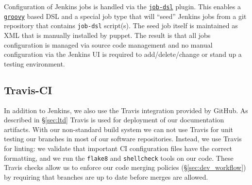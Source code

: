 Configuration of Jenkins jobs is handled via the \href{https://plugins.jenkins.io/job-dsl}{\texttt{job-dsl}} plugin.
This enables a \href{http://www.groovy-lang.org/}{\texttt{groovy}} based DSL and a special job type that
will ``seed'' Jenkins jobs from a git repository that contains \texttt{job-dsl}
script(s).  The seed job itself is maintained as XML that is manually
installed by puppet.  The result is that all jobs configuration is managed via
source code management and no manual configuration via the Jenkins UI is required to
add/delete/change or stand up a testing environment.





\subsection{Travis-CI}
\label{sec:travis-ci}

In addition to Jenkins, we also use the Travis integration provided by GitHub.
As described in \S\ref{sec:ltd} Travis is used for deployment of our documentation artifacts.
With our non-standard build system we can not use Travis for unit testing our branches in most of our software repositories.
Instead, we use Travis for linting: we validate that important CI configuration files have the correct formatting, and we run the \texttt{flake8} and \texttt{shellcheck} tools on our code.
These Travis checks allow us to enforce our code merging policies (\S\ref{sec:dev_workflow}) by requiring that branches are up to date before merges are allowed.
